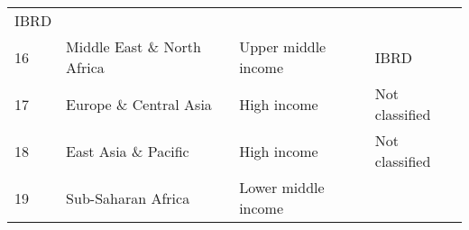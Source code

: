 \documentclass[
]{article}
\begin{document}
\begin{longtable}[]{@{}llll@{}}
\begin{minipage}[t]{0.16\columnwidth}
IBRD\strut
\end{minipage}\tabularnewline
\begin{minipage}[t]{0.06\columnwidth}\raggedright
16\strut
\end{minipage} & \begin{minipage}[t]{0.17\columnwidth}\raggedright
Middle East \& North Africa\strut
\end{minipage} & \begin{minipage}[t]{0.11\columnwidth}\raggedright
Upper middle income\strut
\end{minipage} & \begin{minipage}[t]{0.16\columnwidth}\raggedright
IBRD\strut
\end{minipage}\tabularnewline
\begin{minipage}[t]{0.06\columnwidth}\raggedright
17\strut
\end{minipage} & \begin{minipage}[t]{0.17\columnwidth}\raggedright
Europe \& Central Asia\strut
\end{minipage} & \begin{minipage}[t]{0.11\columnwidth}\raggedright
High income\strut
\end{minipage} & \begin{minipage}[t]{0.16\columnwidth}\raggedright
Not classified\strut
\end{minipage}\tabularnewline
\begin{minipage}[t]{0.06\columnwidth}\raggedright
18\strut
\end{minipage} & \begin{minipage}[t]{0.17\columnwidth}\raggedright
East Asia \& Pacific\strut
\end{minipage} & \begin{minipage}[t]{0.11\columnwidth}\raggedright
High income\strut
\end{minipage} & \begin{minipage}[t]{0.16\columnwidth}\raggedright
Not classified\strut
\end{minipage}\tabularnewline
\begin{minipage}[t]{0.06\columnwidth}\raggedright
19\strut
\end{minipage} & \begin{minipage}[t]{0.17\columnwidth}\raggedright
Sub-Saharan Africa\strut
\end{minipage} & \begin{minipage}[t]{0.11\columnwidth}\raggedright
Lower middle income\strut
\end{minipage} & \begin{minipage}[t]{0.16\columnwidth}\raggedright

\end{minipage}
\end{longtable}
\end{document}
